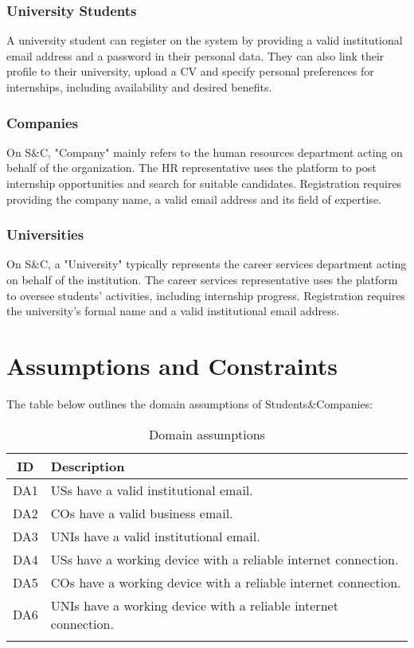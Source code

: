 \subsubsection{University Students}
A university student can register on the system by providing a valid institutional email address and a password in their personal data.
They can also link their profile to their university, upload a CV and specify personal preferences for internships, including availability and desired benefits.

\subsubsection{Companies}
On S\&C, "Company" mainly refers to the human resources department acting on behalf of the organization.
The HR representative uses the platform to post internship opportunities and search for suitable candidates.
Registration requires providing the company name, a valid email address and its field of expertise.

\subsubsection{Universities}
On S\&C, a "University" typically represents the career services department acting on behalf of the institution.
The career services representative uses the platform to oversee students' activities, including internship progress.
Registration requires the university's formal name and a valid institutional email address.

\section{Assumptions and Constraints}
The table below outlines the domain assumptions of Students\&Companies:

\renewcommand{\arraystretch}{1.5}
\begin{longtable}{|c|p{12.5cm}|}
    \hline \rowcolor{polimiblue!40}
    \textbf{ID} & \textbf{Description} \\ \hline \hline
    DA1 & USs have a valid institutional email. \\ \hline
    DA2 & COs have a valid business email. \\ \hline
    DA3 & UNIs have a valid institutional email. \\ \hline
    DA4 & USs have a working device with a reliable internet connection. \\ \hline
    DA5 & COs have a working device with a reliable internet connection. \\ \hline
    DA6 & UNIs have a working device with a reliable internet connection. \\ \hline
\caption{Domain assumptions}
\end{longtable}

